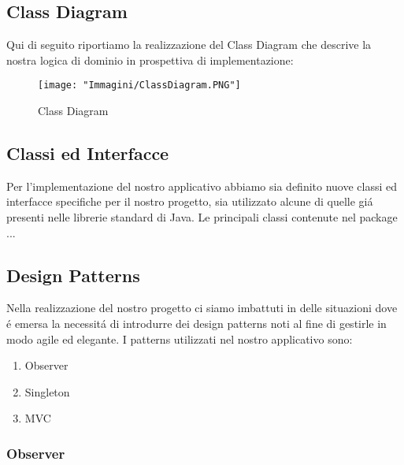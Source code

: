 \documentclass{article}
\begin{document}

\newpage

\subsection{Class Diagram}
Qui di seguito riportiamo la realizzazione del Class Diagram che descrive la nostra logica di dominio in prospettiva di implementazione:

\begin{figure}[!h]
\centering
\texttt{[image: "Immagini/ClassDiagram.PNG"]}
\caption{Class Diagram}
\label{ClassDiagram}
\end{figure}

\newpage

\subsection{Classi ed Interfacce}
Per l'implementazione del nostro applicativo abbiamo sia definito nuove classi ed interfacce specifiche per il nostro progetto, sia utilizzato alcune di quelle gi\'a presenti nelle librerie standard di Java. Le principali classi contenute nel package ... 


\subsection{Design Patterns}
Nella realizzazione del nostro progetto ci siamo imbattuti in delle situazioni dove \'e emersa la necessit\'a di introdurre dei design patterns noti al fine di gestirle in modo agile ed elegante. I patterns utilizzati nel nostro applicativo sono: 

\begin{enumerate}
\item Observer
\item Singleton
\item MVC
\end{enumerate}

\subsubsection{Observer}
\end{document}
